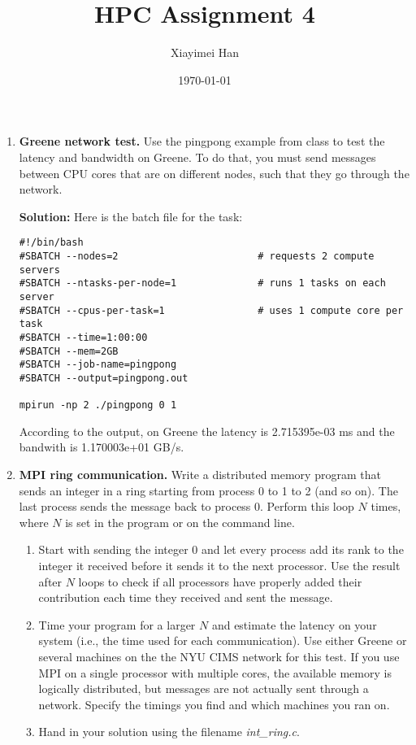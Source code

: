 \documentclass{article}
\title{HPC Assignment 4}
\author{Xiayimei Han}
\date{\today}
\begin{document}
\maketitle
\begin{enumerate}
    \item \textbf{Greene network test.} Use the pingpong example from class to test the latency and bandwidth on Greene. To do that, you must send messages between CPU cores that are on different nodes, such that they go through the network.
    
    \textbf{Solution: }Here is the batch file for the task:
    \begin{verbatim}
#!/bin/bash 
#SBATCH --nodes=2                        # requests 2 compute servers
#SBATCH --ntasks-per-node=1              # runs 1 tasks on each server
#SBATCH --cpus-per-task=1                # uses 1 compute core per task
#SBATCH --time=1:00:00
#SBATCH --mem=2GB
#SBATCH --job-name=pingpong
#SBATCH --output=pingpong.out

mpirun -np 2 ./pingpong 0 1
    \end{verbatim}
According to the output, on Greene the latency is 2.715395e-03 ms and the bandwith is 1.170003e+01 GB/s.

\item \textbf{MPI ring communication.} Write a distributed memory program that sends an integer in a ring starting from process 0 to 1 to 2 (and so on). The last process sends the message back to process
0. Perform this loop $N$ times, where $N$ is set in the program or on the command line.
\begin{enumerate}
    \item Start with sending the integer 0 and let every process add its rank to the integer it received before it sends it to the next processor. Use the result after $N$ loops to check if all processors have properly added their contribution each time they received and sent the message.
    \item Time your program for a larger $N$ and estimate the latency on your system (i.e., the time used for each communication). Use either Greene or several machines on the the NYU CIMS network for this test. If you use MPI on a single processor with multiple cores, the available memory is logically distributed, but messages are not actually sent through a network. Specify the timings you find and which machines you ran on.
    \item Hand in your solution using the filename \textit{int\_ring.c}.
    

\end{enumerate}
\end{enumerate}
\end{document}
